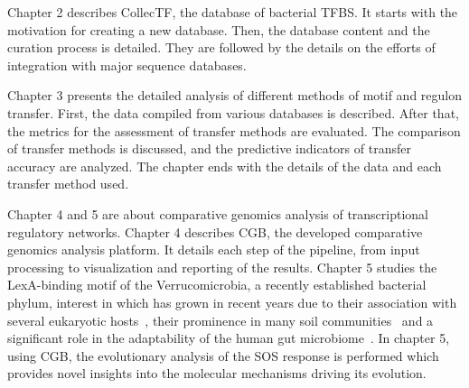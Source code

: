 Chapter 2 describes CollecTF, the database of bacterial TFBS. It starts with
the motivation for creating a new database. Then, the database content and the
curation process is detailed. They are followed by the details on the efforts
of integration with major sequence databases.

Chapter 3 presents the detailed analysis of different methods of motif and
regulon transfer. First, the data compiled from various databases is
described. After that, the metrics for the assessment of transfer methods are
evaluated. The comparison of transfer methods is discussed, and the predictive
indicators of transfer accuracy are analyzed. The chapter ends with the details
of the data and each transfer method used.

Chapter 4 and 5 are about comparative genomics analysis of transcriptional
regulatory networks. Chapter 4 describes CGB, the developed comparative
genomics analysis platform. It details each step of the pipeline, from input
processing to visualization and reporting of the results. Chapter 5 studies the
LexA-binding motif of the Verrucomicrobia, a recently established bacterial
phylum, interest in which has grown in recent years due to their association
with several eukaryotic hosts~\cite{sait2011genomic}, their prominence in many
soil communities~\cite{bergmann2011under} and a significant role in the
adaptability of the human gut microbiome~\cite{dubourg2013high}. In chapter 5,
using CGB, the evolutionary analysis of the SOS response is performed which
provides novel insights into the molecular mechanisms driving its evolution.
